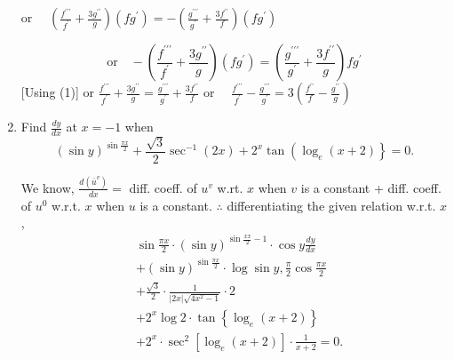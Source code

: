 \begin{enumerate}
\begin{outline}
or $\quad\left(\frac{f^{\prime \prime \prime}}{f^{\prime}}+\frac{3 g^{\prime \prime}}{g}\right)\left(f g^{\prime}\right)=-\left(\frac{g^{\prime \prime \prime}}{g^{\prime}}+\frac{3 f^{\prime \prime}}{f}\right)\left(f g^{\prime}\right)$

$$  \text{or} \quad
-\left(\frac{f^{\prime \prime \prime}}{f^{\prime}}+\frac{3 g^{\prime \prime}}{g}\right)\left(f g^{\prime}\right)=\left(\frac{g^{\prime \prime \prime}}{g^{\prime}}+\frac{3 f^{\prime \prime}}{g}\right) f g^{\prime}
$$
[Using (1)]
or $\frac{f^{\prime \prime \prime}}{f^{\prime}}+\frac{3 g^{\prime \prime}}{g}=\frac{g^{\prime \prime \prime}}{g^{\prime}}+\frac{3 f^{\prime \prime}}{f}$
or $\quad \frac{f^{\prime \prime \prime}}{f^{\prime}}-\frac{g^{\prime \prime \prime}}{g^{\prime}}=3\left(\frac{f^{\prime \prime}}{f}-\frac{g^{\prime \prime}}{g}\right)$
\end{outline}

\newpage
\item
Find $\frac{d y}{d x}$ at $x=-1$ when
$$
(\sin y)^{\sin \frac{\pi x}{2}}+\frac{\sqrt{3}}{2} \sec ^{-1}(2 x)+2^x \tan \left(\log _e(x+2)\right\}=0 .
$$

\begin{outline}
    We know,
$\frac{d\left(\bar{u}^v\right)}{d x}=$ diff. coeff. of $u^v$ w.rt. $x$ when $v$ is a constant
+ diff. coeff. of $u^0$ w.r.t. $x$ when $u$ is a constant.
$\therefore$ differentiating the given relation w.r.t. $x$,
$$
\begin{aligned}
& \sin \frac{\pi x}{2} \cdot(\sin y)^{\sin \frac{x x}{2}-1} \cdot \cos y \frac{d y}{d x} \\
& +(\sin y)^{\sin \frac{\pi x}{2}} \cdot \log \sin y, \frac{\pi}{2} \cos \frac{\pi x}{2} \\
& +\frac{\sqrt{3}}{2}\cdot \frac{1}{|2 x| \sqrt{4 x^2-1}} \cdot 2 \\
& +2^x \log 2 \cdot \tan \left\{\log _e(x+2)\right\} \\
& +2^x \cdot \sec ^2\left[\log _e(x+2)\right] \cdot \frac{1}{x+2}=0 . \\
&
\end{aligned}
$$


\end{outline}
\end{enumerate}
